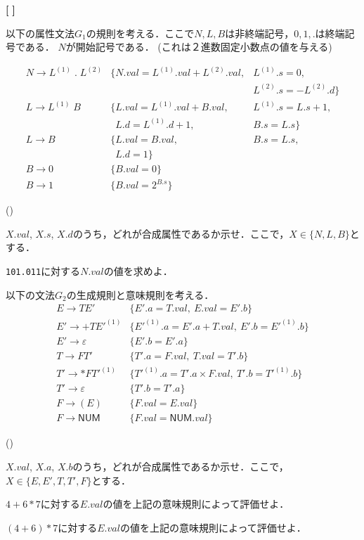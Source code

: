 \documentclass[dvipdfmx]{jarticle}
\newcounter{coffee}
\newcounter{bean}
\begin{document}
\begin{list}{{\bf [\,\,]}}{}
\item
以下の属性文法$G_1$の規則を考える．ここで$N,L,B$は非終端記号，$0,1,\texttt{.}$は終端記号である．
$N$が開始記号である．
(これは２進数固定小数点の値を与える)

\[
\begin{array}{lll}
  N\rightarrow L^{(1)}\;\texttt{.}\;L^{(2)} & \{N.val=L^{(1)}.val+L^{(2)}.val, & L^{(1)}.s=0,\\
  & & L^{(2)}.s=-L^{(2)}.d\}\\
  L\rightarrow L^{(1)}\;B & \{L.val = L^{(1)}.val+B.val, & L^{(1)}.s=L.s+1,\\
    & \phantom{\{}L.d=L^{(1)}.d+1, & B.s=L.s\}\\
  L\rightarrow B & \{L.val=B.val, & B.s=L.s,\\
    & \phantom{\{}L.d=1\} & \\
  B\rightarrow 0 & \{B.val=0\}\\
  B\rightarrow 1 & \{B.val=2^{B.s}\}
\end{array}\]

\begin{list}{()}{}
  \item $X.val$, $X.s$, $X.d$のうち，どれが合成属性であるか示せ．ここで，$X\in\{N,L,B\}$とする．
  \item \texttt{101.011}に対する$N.val$の値を求めよ．
\end{list}
\item 以下の文法$G_2$の生成規則と意味規則を考える．
\[
\begin{array}{ll}
  E\rightarrow TE' & \{E'.a=T.val,\ E.val=E'.b\}\\
  E'\rightarrow +TE'^{(1)} & \{{E'^{(1)}.a=E'.a+T.val},\ E'.b=E'^{(1)}.b\}\\
  E'\rightarrow\varepsilon & \{E'.b=E'.a\}\\
  T\rightarrow FT' & \{T'.a=F.val,\ T.val=T'.b\}\\
  T'\rightarrow \ast FT'^{(1)} & \{T'^{(1)}.a=T'.a\times F.val,\ T'.b=T'^{(1)}.b\}\\
  T'\rightarrow\varepsilon & \{T'.b=T'.a\}\\
  F\rightarrow (E) & \{F.val=E.val\}\\
  F\rightarrow\mathsf{NUM} & \{F.val=\mathsf{NUM}.val\}
\end{array}
\]
  \begin{list}{()}{}
    \item $X.val$, $X.a$, $X.b$のうち，どれが合成属性であるか示せ．ここで，$X\in\{E,E',T,T',F\}$とする．
    \item $4+6\ast 7$に対する$E.val$の値を上記の意味規則によって評価せよ．
    \item $(4+6)\ast 7$に対する$E.val$の値を上記の意味規則によって評価せよ．
  \end{list}
\end{list}
\end{document}
